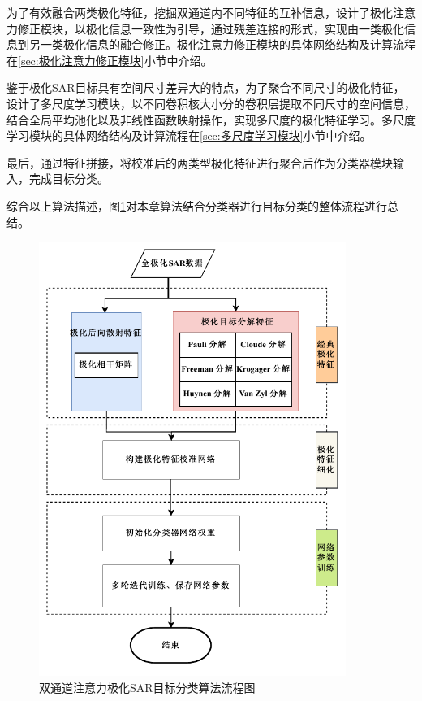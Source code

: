 为了有效融合两类极化特征，挖掘双通道内不同特征的互补信息，设计了极化注意力修正模块，以极化信息一致性为引导，通过残差连接的形式，实现由一类极化信息到另一类极化信息的融合修正。极化注意力修正模块的具体网络结构及计算流程在\ref{sec:极化注意力修正模块}小节中介绍。

鉴于极化SAR目标具有空间尺寸差异大的特点，为了聚合不同尺寸的极化特征，设计了多尺度学习模块，以不同卷积核大小分的卷积层提取不同尺寸的空间信息，结合全局平均池化以及非线性函数映射操作，实现多尺度的极化特征学习。多尺度学习模块的具体网络结构及计算流程在\ref{sec:多尺度学习模块}小节中介绍。

最后，通过特征拼接，将校准后的两类型极化特征进行聚合后作为分类器模块输入，完成目标分类。

综合以上算法描述，图\ref{流程图}对本章算法结合分类器进行目标分类的整体流程进行总结。
\begin{figure}[ht!]
    \centering
    \includegraphics[width=10cm]{pic/chapter3/DP流程图.pdf}
    \caption{双通道注意力极化SAR目标分类算法流程图}
    \label{流程图}
\end{figure}

